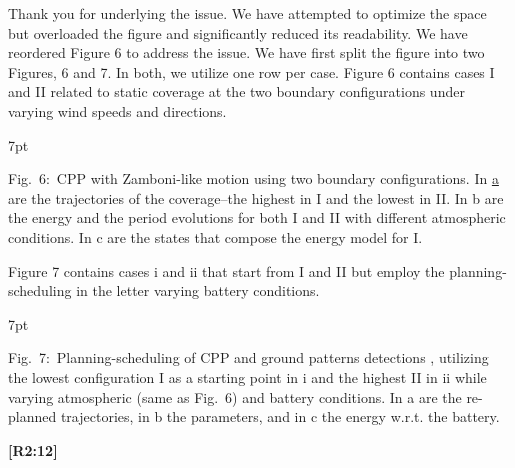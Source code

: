\documentclass[10pt]{letter}
\newenvironment{formal}{%
  \def\FrameCommand{%
    \hspace{1pt}%
    {\color{red}\vrule width 2pt}%
    {\color{formalshade}\vrule width 4pt}%
    \colorbox{formalshade}%
  }%
  \MakeFramed{\advance\hsize-\width\FrameRestore}%
  \noindent\hspace{-4.55pt}%
  \begin{adjustwidth}{}{7pt}%
  \vspace{2pt}\vspace{2pt}%
}
{%
  \vspace{2pt}\end{adjustwidth}\endMakeFramed%
}
\begin{document}
{\color{blue} 

{\hspace*{-4.5em}{[R2:11]}\vspace*{-1.9em}}

Thank you for underlying the issue. We have attempted to optimize the space but overloaded the figure and significantly reduced its readability. We have reordered Figure 6 to address the issue. We have first split the figure into two Figures, 6 and 7. In both, we utilize one row per case. Figure 6 contains cases I and II related to static coverage at the two boundary configurations under varying wind speeds and directions.


\begin{formal}
  \footnotesize
  
  {\color{blue}Fig.~6:~\color{blue}CPP with Zamboni-like motion using two boundary configurations. In \hyperref[fig:stat]{a} are the trajectories of the coverage--the highest in {\color{red}I} and the lowest in {\color{red}II}. In {\color{red}b} are the energy and the period evolutions for both {\color{red}I} and {\color{red}II} with different atmospheric conditions. In {\color{red}c} are the states that compose the energy model for {\color{red}I}.}
\end{formal}

Figure 7 contains cases i and ii that start from I and II but employ the planning-scheduling in the letter varying battery conditions. 

\begin{formal}
  \footnotesize
  
  \vspace*{-.6ex}
  {\color{blue}
  Fig.~7:~Planning-scheduling of CPP and ground patterns detections%
  , utilizing the lowest configuration {\color{red}I} as a starting point in {\color{red}i} and the highest {\color{red}II} in {\color{red}ii} while varying atmospheric (same as Fig.~{\color{red}6}) and battery conditions. In {\color{red}a} are the re-planned trajectories, in {\color{red}b} the parameters, and in {\color{red}c} the energy w.r.t. the battery.}
  \vspace*{1ex}
\end{formal}
}

\vspace*{2em}

{\hspace*{-4.5em}\textbf{[R2:12]}\vspace*{-1.9em}}
\end{document}

